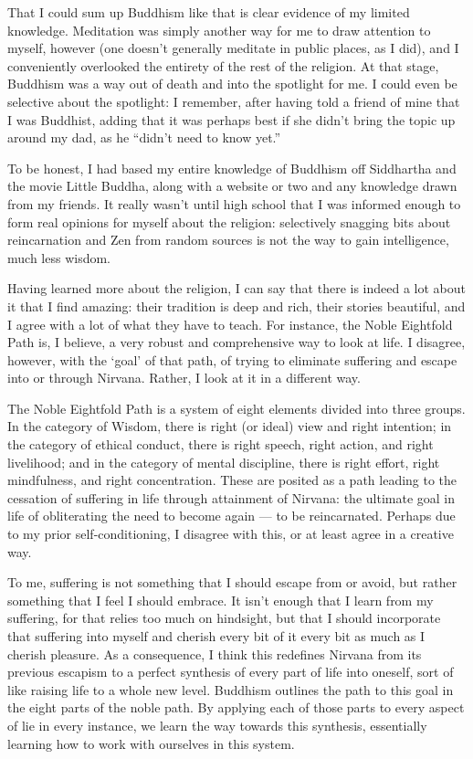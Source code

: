 \documentclass{book}
\begin{document}
That I could sum up Buddhism like that is clear evidence of my limited knowledge.  Meditation was simply another way for me to draw attention to myself, however (one doesn't generally meditate in public places, as I did), and I conveniently overlooked the entirety of the rest of the religion.  At that stage, Buddhism was a way out of death and into the spotlight for me.  I could even be selective about the spotlight: I remember, after having told a friend of mine that I was Buddhist, adding that it was perhaps best if she didn't bring the topic up around my dad, as he ``didn't need to know yet.''

To be honest, I had based my entire knowledge of Buddhism off Siddhartha and the movie Little Buddha, along with a website or two and any knowledge drawn from my friends.  It really wasn't until high school that I was informed enough to form real opinions for myself about the religion: selectively snagging bits about reincarnation and Zen from random sources is not the way to gain intelligence, much less wisdom.

Having learned more about the religion, I can say that there is indeed a lot about it that I find amazing: their tradition is deep and rich, their stories beautiful, and I agree with a lot of what they have to teach.  For instance, the Noble Eightfold Path is, I believe, a very robust and comprehensive way to look at life.  I disagree, however, with the `goal' of that path, of trying to eliminate suffering and escape into or through Nirvana.  Rather, I look at it in a different way.

The Noble Eightfold Path is a system of eight elements divided into three groups.  In the category of Wisdom, there is right (or ideal) view and right intention; in the category of ethical conduct, there is right speech, right action, and right livelihood; and in the category of mental discipline, there is right effort, right mindfulness, and right concentration.  These are posited as a path leading to the cessation of suffering in life through attainment of Nirvana: the ultimate goal in life of obliterating the need to become again --- to be reincarnated.  Perhaps due to my prior self-conditioning, I disagree with this, or at least agree in a creative way.

To me, suffering is not something that I should escape from or avoid, but rather something that I feel I should embrace.  It isn't enough that I learn from my suffering, for that relies too much on hindsight, but that I should incorporate that suffering into myself and cherish every bit of it every bit as much as I cherish pleasure.  As a consequence, I think this redefines Nirvana from its previous escapism to a perfect synthesis of every part of life into oneself, sort of like raising life to a whole new level.  Buddhism outlines the path to this goal in the eight parts of the noble path.  By applying each of those parts to every aspect of lie in every instance, we learn the way towards this synthesis, essentially learning how to work with ourselves in this system.
\end{document}
